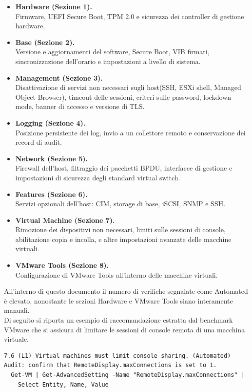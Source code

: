 \documentclass[a4paper,11pt]{report}
\begin{document}
\begin{itemize}
\item \textbf{Hardware (Sezione 1).}\\
Firmware, UEFI Secure Boot, TPM 2.0 e sicurezza dei controller di gestione hardware.
\item \textbf{Base (Sezione 2).}\\
Versione e aggiornamenti del software, Secure Boot, VIB firmati, sincronizzazione dell'orario e impostazioni a livello di sistema.
\item \textbf{Management (Sezione 3).}\\
Disattivazione di servizi non necessari sugli host(SSH, ESXi shell, Managed Object Browser), timeout delle sessioni, criteri sulle password, lockdown mode, banner di accesso e versione di TLS.
\item \textbf{Logging (Sezione 4).}\\
Posizione persistente dei log, invio a un collettore remoto e conservazione dei record di audit.
\item \textbf{Network (Sezione 5).}\\
Firewall dell'host, filtraggio dei pacchetti BPDU, interfacce di gestione e impostazioni di sicurezza degli standard virtual switch.
\item \textbf{Features (Sezione 6).}\\
Servizi opzionali dell'host: CIM, storage di base, iSCSI, SNMP e SSH.
\item \textbf{Virtual Machine (Sezione 7).}\\
Rimozione dei dispositivi non necessari, limiti sulle sessioni di console, abilitazione copia e incolla, e altre impostazioni avanzate delle macchine virtuali.
\item \textbf{VMware Tools (Sezione 8).}\\
Configurazione di VMware Tools all'interno delle macchine virtuali.
\end{itemize}

All'interno di questo documento il numero di verifiche segnalate come Automated è elevato, nonostante le sezioni Hardware e VMware Tools siano interamente manuali.\\
Di seguito si riporta un esempio di raccomandazione estratta dal benchmark VMware che si assicura di limitare le sessioni di console remota di una macchina virtuale.

\begin{lstlisting}[style=azcli]
7.6 (L1) Virtual machines must limit console sharing. (Automated)
Audit: confirm that RemoteDisplay.maxConnections is set to 1.
  Get-VM | Get-AdvancedSetting -Name "RemoteDisplay.maxConnections" |
    Select Entity, Name, Value
\end{lstlisting}
\end{document}
